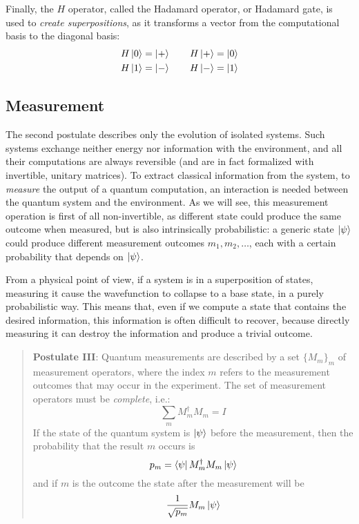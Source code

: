 
Finally, the $H$ operator, called the Hadamard operator, or Hadamard gate, is used to \textit{create superpositions}, as it transforms a vector from the computational basis to the diagonal basis:
\begin{gather*}
	H\ket{0} = \ket{+} \qquad H\ket{+} = \ket{0}  \\
	H\ket{1} = \ket{-} \qquad H\ket{-} = \ket{1} \\	 
\end{gather*}
\subsection{Measurement}

The second postulate describes only the evolution of isolated systems. Such systems exchange neither energy nor information with the environment, and all their computations are always reversible (and are in fact formalized with invertible, unitary matrices). To extract classical information from the system, to \textit{measure} the output of a quantum computation, an interaction is needed between the quantum system and the environment. As we will see, this measurement operation is first of all non-invertible, as different state could produce the same outcome when measured, but is also intrinsically probabilistic: a generic state $\ket{\psi}$ could produce different measurement outcomes $m_1, m_2,\ldots$, each with a certain probability that depends on $\ket{\psi}$.

From a physical point of view, if a system is in a superposition of states, measuring it cause the wavefunction to collapse to a base state, in a purely probabilistic way. This means that, even if we compute a state that contains the desired information, this information is often difficult to recover, because directly measuring  it can destroy the information and produce a trivial outcome.

\begin{quote} \textbf{Postulate III}: Quantum measurements are described by a set $\{M_m\}_m$ of measurement operators, where the index $m$ refers to the measurement outcomes that may occur in the experiment. The set of measurement operators must be \textit{complete}, i.e.:
\[\sum_m M_m^\dagger M_m = I\]
If the state of the quantum system is $\ket{\psi}$ before the measurement, then the probability that the result $m$ occurs is 
\[p_m = \bra{\psi}M_m^\dagger M_m\ket{\psi}\]
and if $m$ is the outcome the state after the measurement will be \[\frac{1}{\sqrt{p_m}}M_m\ket{\psi}\]
\end{quote}

